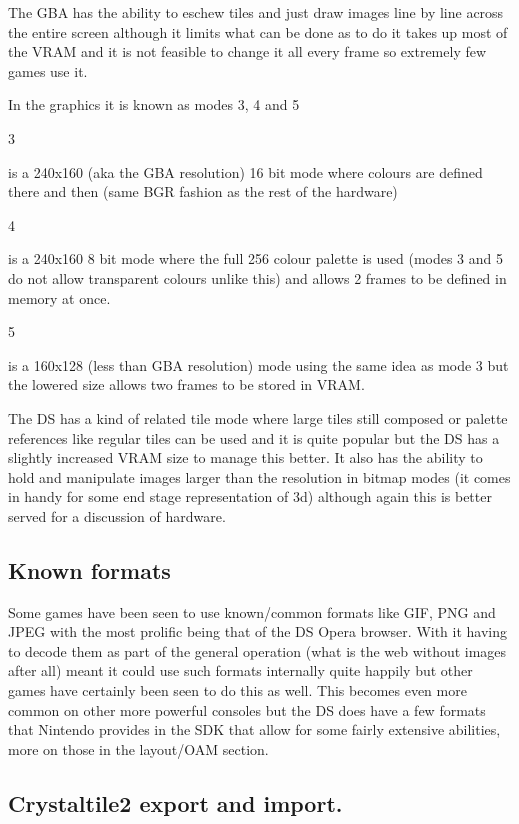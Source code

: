 \documentclass[
]{book}
\begin{document}
The GBA has the ability to eschew tiles and just draw images line by line across the entire screen although it limits what can be done as to do it takes up most of the VRAM and it is not feasible to change it all every frame so extremely few games use it.

In the graphics it is known as modes 3, 4 and 5

3

is a 240x160 (aka the GBA resolution) 16 bit mode where colours are defined there and then (same BGR fashion as the rest of the hardware)

4

is a 240x160 8 bit mode where the full 256 colour palette is used (modes 3 and 5 do not allow transparent colours unlike this) and allows 2 frames to be defined in memory at once.

5

is a 160x128 (less than GBA resolution) mode using the same idea as mode 3 but the lowered size allows two frames to be stored in VRAM.

The DS has a kind of related tile mode where large tiles still composed or palette references like regular tiles can be used and it is quite popular but the DS has a slightly increased VRAM size to manage this better. It also has the ability to hold and manipulate images larger than the resolution in bitmap modes (it comes in handy for some end stage representation of 3d) although again this is better served for a discussion of hardware.

\hypertarget{known-formats}{%
\subsection{Known formats}\label{known-formats}}

Some games have been seen to use known/common formats like GIF, PNG and JPEG with the most prolific being that of the DS Opera browser. With it having to decode them as part of the general operation (what is the web without images after all) meant it could use such formats internally quite happily but other games have certainly been seen to do this as well. This becomes even more common on other more powerful consoles but the DS does have a few formats that Nintendo provides in the SDK that allow for some fairly extensive abilities, more on those in the layout/OAM section.

\hypertarget{crystaltile2-export-and-import.}{%
\subsection{Crystaltile2 export and import.}\label{crystaltile2-export-and-import.}}
\end{document}
